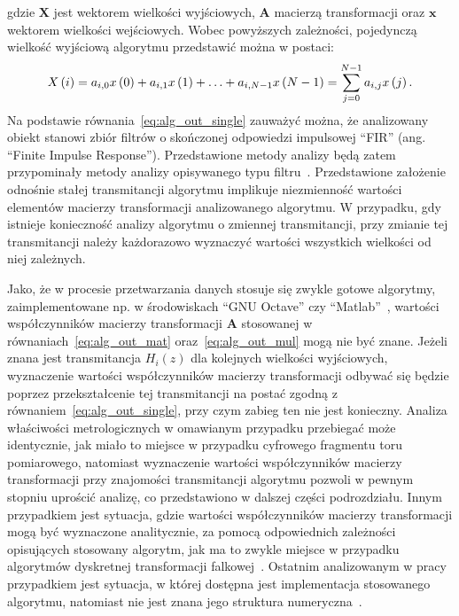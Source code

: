 gdzie $\mathbf{X}$ jest wektorem wielkości wyjściowych, $\mathbf{A}$ macierzą transformacji oraz $\mathbf{x}$ wektorem wielkości wejściowych. Wobec powyższych zależności, pojedynczą wielkość wyjściową algorytmu przedstawić można w postaci:
\begin{equation}
X \left(i\right) = a_{i, 0} x \left(0\right) + a_{i, 1} x \left(1\right) + \hdots + a_{i, N-1} x \left(N-1\right) = \sum _{j = 0} ^{N-1} a_{i,j} x \left(j\right) \label{eq:alg_out_single}.
\end{equation}
Na podstawie równania~\eqref{eq:alg_out_single} zauważyć można, że analizowany obiekt stanowi zbiór filtrów o skończonej odpowiedzi impulsowej \enquote{FIR} (ang. \enquote{Finite Impulse Response}). Przedstawione metody analizy będą zatem przypominały metody analizy opisywanego typu filtru~\cite{mehrnia_fir}. Przedstawione założenie odnośnie stałej transmitancji algorytmu implikuje niezmienność wartości elementów macierzy transformacji analizowanego algorytmu. W przypadku, gdy istnieje konieczność analizy algorytmu o zmiennej transmitancji, przy zmianie tej transmitancji należy każdorazowo wyznaczyć wartości wszystkich wielkości od niej zależnych.

Jako, że w procesie przetwarzania danych stosuje się zwykle gotowe algorytmy, zaimplementowane np. w środowiskach \enquote{GNU Octave} czy \enquote{Matlab}~\cite{pruuvsa_dwt, lee_pywavelets}, wartości współczynników macierzy transformacji $\mathbf{A}$ stosowanej w równaniach~\eqref{eq:alg_out_mat} oraz~\eqref{eq:alg_out_mul} mogą nie być znane. Jeżeli znana jest transmitancja $H_{i}(z)$ dla kolejnych wielkości wyjściowych, wyznaczenie wartości współczynników macierzy transformacji odbywać się będzie poprzez przekształcenie tej transmitancji na postać zgodną z równaniem~\eqref{eq:alg_out_single}, przy czym zabieg ten nie jest konieczny. Analiza właściwości metrologicznych w omawianym przypadku przebiegać może identycznie, jak miało to miejsce w przypadku cyfrowego fragmentu toru pomiarowego, natomiast wyznaczenie wartości współczynników macierzy transformacji przy znajomości transmitancji algorytmu pozwoli w pewnym stopniu uprościć analizę, co przedstawiono w dalszej części podrozdziału. Innym przypadkiem jest sytuacja, gdzie wartości współczynników macierzy transformacji mogą być wyznaczone analitycznie, za pomocą odpowiednich zależności opisujących stosowany algorytm, jak ma to zwykle miejsce w przypadku algorytmów dyskretnej transformacji falkowej~\cite{vonesch_dbbasics}. Ostatnim analizowanym w pracy przypadkiem jest sytuacja, w której dostępna jest implementacja stosowanego algorytmu, natomiast nie jest znana jego struktura numeryczna~\cite{misiti_matlabwav}.

